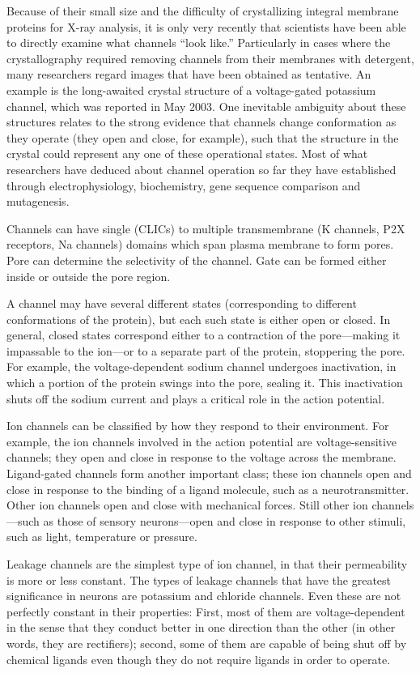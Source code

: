 Because of their small size and the difficulty of crystallizing integral membrane proteins for X-ray analysis, it is only very recently that scientists have been able to directly examine what channels ``look like.'' Particularly in cases where the crystallography required removing channels from their membranes with detergent, many researchers regard images that have been obtained as tentative. An example is the long-awaited crystal structure of a voltage-gated potassium channel, which was reported in May 2003. One inevitable ambiguity about these structures relates to the strong evidence that channels change conformation as they operate (they open and close, for example), such that the structure in the crystal could represent any one of these operational states. Most of what researchers have deduced about channel operation so far they have established through electrophysiology, biochemistry, gene sequence comparison and mutagenesis.

Channels can have single (CLICs) to multiple transmembrane (K channels, P2X receptors, Na channels) domains which span plasma membrane to form pores. Pore can determine the selectivity of the channel. Gate can be formed either inside or outside the pore region.

A channel may have several different states (corresponding to different conformations of the protein), but each such state is either open or closed. In general, closed states correspond either to a contraction of the pore---making it impassable to the ion---or to a separate part of the protein, stoppering the pore. For example, the voltage-dependent sodium channel undergoes inactivation, in which a portion of the protein swings into the pore, sealing it. This inactivation shuts off the sodium current and plays a critical role in the action potential.

Ion channels can be classified by how they respond to their environment. For example, the ion channels involved in the action potential are voltage-sensitive channels; they open and close in response to the voltage across the membrane. Ligand-gated channels form another important class; these ion channels open and close in response to the binding of a ligand molecule, such as a neurotransmitter. Other ion channels open and close with mechanical forces. Still other ion channels---such as those of sensory neurons---open and close in response to other stimuli, such as light, temperature or pressure.

Leakage channels are the simplest type of ion channel, in that their permeability is more or less constant. The types of leakage channels that have the greatest significance in neurons are potassium and chloride channels. Even these are not perfectly constant in their properties: First, most of them are voltage-dependent in the sense that they conduct better in one direction than the other (in other words, they are rectifiers); second, some of them are capable of being shut off by chemical ligands even though they do not require ligands in order to operate.

